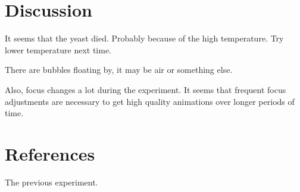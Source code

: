 \documentclass[12pt, a4paper]{article}
\begin{document}
\section{Discussion}

It seems that the yeast died. Probably because of the high
temperature.  Try lower temperature next time.

There are bubbles floating by, it may be air or something else.   

Also, focus changes a lot during the experiment. It seems that
frequent focus adjustments are necessary to get high quality
animations over longer periods of time.



\section{References}


The previous experiment.
\end{document}
